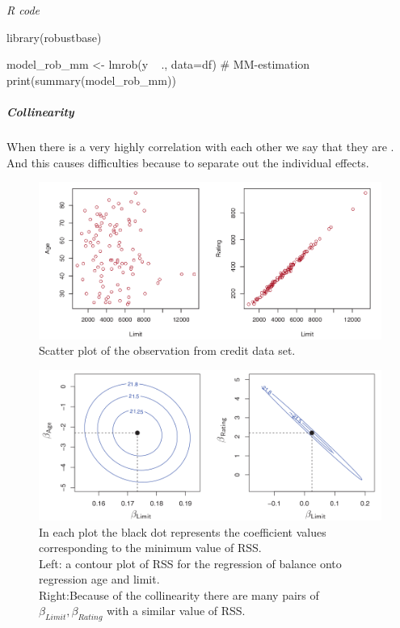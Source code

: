 \emph{R code}
\begin{rcode}[deletekeywords={model, df}]
library(robustbase)

model_rob_mm <- lmrob(y ~ ., data=df) # MM-estimation
print(summary(model_rob_mm))
\end{rcode}
\subparagraph{Collinearity}
When there is a very highly correlation with each other we say that
they are . And this causes difficulties because to
separate out the individual effects.
\begin{figure}[H]
	\begin{center}
		\includegraphics[width=\textwidth]{./chap/1chap/2sec/2images/2_11collinearity.png}
	\end{center}
	\caption{Scatter plot of the observation from credit data set.
	}
	\label{fig:fig2.8}
\end{figure}
\begin{figure}[H]
	\begin{center}
		\includegraphics[width=\textwidth]{./chap/1chap/2sec/2images/2_12contourPlotCollinearity.png}
	\end{center}
	\caption{In each plot the black dot represents the coefficient
	values corresponding to the minimum value of RSS.\\
	Left: a contour plot of RSS for the regression of balance onto
	regression age and limit.\\Right:Because of the collinearity
	there are many pairs of $\beta_{Limit},\beta_{Rating}$ with a
	similar value of RSS.}
	\label{fig:fig2.8}
\end{figure}
